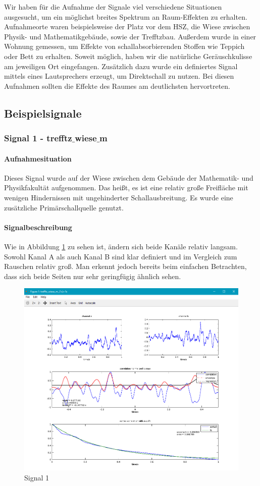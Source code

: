 Wir haben für die Aufnahme der Signale viel verschiedene Situationen ausgesucht, um ein möglichst breites Spektrum an Raum-Effekten zu erhalten. Aufnahmeorte waren beispielsweise der Platz vor dem HSZ, die Wiese zwischen Physik- und Mathematikgebäude, sowie der Trefftzbau. Außerdem wurde in einer Wohnung gemessen, um Effekte von schallabsorbierenden Stoffen wie Teppich oder Bett zu erhalten. Soweit möglich, haben wir die natürliche Geräuschkulisse am jeweiligen Ort eingefangen. Zusätzlich dazu wurde ein definiertes Signal mittels eines Lautsprechers erzeugt, um Direktschall zu nutzen. Bei diesen Aufnahmen sollten die Effekte des Raumes am deutlichsten hervortreten.
\subsection{Beispielsignale}
\subsubsection{Signal 1 - trefftz$\_$wiese$\_$m}
\paragraph{Aufnahmesituation} Dieses Signal wurde auf der Wiese zwischen dem Gebäude der Mathematik- und Physikfakultät aufgenommen. Das heißt, es ist eine relativ große Freifläche mit wenigen Hindernissen mit ungehinderter Schallausbreitung. Es wurde eine zusätzliche Primärschallquelle genutzt.
\paragraph{Signalbeschreibung} Wie in Abbildung \ref{figure2} zu sehen ist, ändern sich beide Kanäle relativ langsam. Sowohl Kanal A als auch Kanal B sind klar definiert und im Vergleich zum Rauschen relativ groß. Man erkennt jedoch bereits beim einfachen Betrachten, dass sich beide Seiten nur sehr geringfügig ähnlich sehen.
\begin{figure}[ht!]
  \centering
  \includegraphics[scale=0.64]{img/trefftz_wiese_m}
  \caption{Signal 1}
  \label{figure2}
\end{figure}

